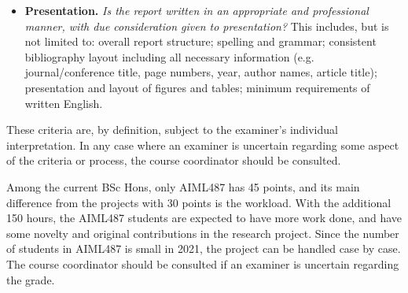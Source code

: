 \begin{itemize}
\item {\bf Presentation.}  {\em Is the report written in an
    appropriate and professional manner, with due consideration given
    to presentation?}  This includes, but is not limited to: overall
  report structure; spelling and grammar; consistent bibliography
  layout including all necessary information (e.g. journal/conference
  title, page numbers, year, author names, article title);
  presentation and layout of figures and tables; minimum requirements
  of written English.

\end{itemize}
These criteria are, by definition, subject to the examiner's
individual interpretation.  In any case where an examiner is uncertain
regarding some aspect of the criteria or process, the course
coordinator should be consulted.

Among the current BSc Hons, only AIML487 has 45 points, and its main difference from the projects with 30 points is the workload. With the additional 150 hours, the AIML487 students are expected to have more work done, and have some novelty and original contributions in the research project. Since the number of students in AIML487 is small in 2021, the project can be handled case by case. The course coordinator should be consulted if an examiner is uncertain regarding the grade. 
